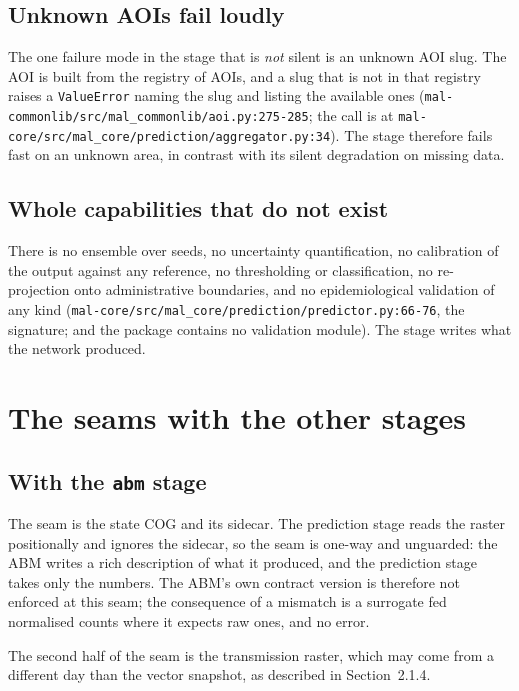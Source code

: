 \documentclass[11pt,a4paper]{article}
\newcommand{\code}[1]{\texttt{#1}}
\begin{document}
\subsection{Unknown AOIs fail loudly}

The one failure mode in the stage that is \emph{not} silent is an unknown AOI
slug. The AOI is built from the registry of AOIs, and a slug that is not in
that registry raises a \code{ValueError} naming the slug and listing the
available ones
(\code{mal-commonlib/src/mal\_commonlib/aoi.py:275-285}; the call is at
\code{mal-core/src/mal\_core/prediction/aggregator.py:34}). The stage
therefore fails fast on an unknown area, in contrast with its silent
degradation on missing data.

\subsection{Whole capabilities that do not exist}

There is no ensemble over seeds, no uncertainty quantification, no
calibration of the output against any reference, no thresholding or
classification, no re-projection onto administrative boundaries, and no
epidemiological validation of any kind
(\code{mal-core/src/mal\_core/prediction/predictor.py:66-76}, the signature;
and the package contains no validation module). The stage writes what the
network produced.

\section{The seams with the other stages}

\subsection{With the \code{abm} stage}

The seam is the state COG and its sidecar. The prediction stage reads the
raster positionally and ignores the sidecar, so the seam is one-way and
unguarded: the ABM writes a rich description of what it produced, and the
prediction stage takes only the numbers. The ABM's own contract version
 is therefore not enforced at this seam; the
consequence of a mismatch is a surrogate fed normalised counts where it
expects raw ones, and no error.

The second half of the seam is the transmission raster, which may come from a
different day than the vector snapshot, as described in
Section~2.1.4.
\end{document}
